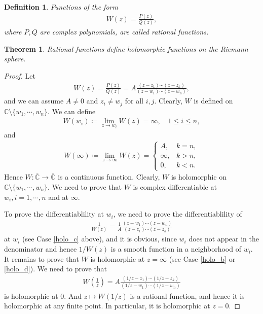 \documentclass[11pt]{book}
\newtheorem{definition}{Definition}[chapter]
\newtheorem{theorem}{Theorem}[chapter]
\theoremstyle{definition}
\numberwithin{equation}{chapter}
\begin{document}
\medskip

\begin{definition}
Functions of the form
\begin{align*}
    W(z) = \frac{P(z)}{Q(z)},
\end{align*}
where $P,Q$ are complex polynomials, are called rational functions.
\end{definition}

\medskip

\begin{theorem}
Rational functions define holomorphic functions on the Riemann sphere.
\end{theorem}
\begin{proof}
Let
\begin{align*}
    W(z) = \frac{P(z)}{Q(z)} = A \frac{(z - z_1) \cdots (z - z_k)}{(z - w_1) \cdots (z - w_n)},
\end{align*}
and we can assume $A \neq 0$ and $z_i \neq w_j$ for all $i,j$. Clearly, $W$ is defined on $\mathbb{C} \setminus \{w_1, \cdots, w_n\}$. We can define
\begin{align*}
    W(w_i) \coloneqq \lim_{z \to w_i} W(z) = \infty, \quad 1 \leq i \leq n,
\end{align*}
and 
\begin{align*}
    W(\infty) \coloneqq \lim_{z \to \infty} W(z) = \begin{cases}
        A, & k = n, \\
        \infty, & k > n, \\
        0, & k < n.
    \end{cases}
\end{align*}
Hence $W: \overline{\mathbb{C}} \to \overline{\mathbb{C}}$ is a continuous function. Clearly, $W$ is holomorphic on $\mathbb{C} \setminus \{w_1, \cdots, w_n\}$. We need to prove that $W$ is complex differentiable at $w_i, i = 1, \cdots, n$ and at $\infty$.

To prove the differentiablility at $w_i$, we need to prove the differentiablility of
\begin{align*}
    \frac{1}{W(z)} = \frac{1}{A} \frac{(z - w_1) \cdots (z - w_n)}{(z - z_1) \cdots (z - z_k)}
\end{align*}
at $w_i$ (see Case \ref{holo_c} above), and it is obvious, since $w_i$ does not appear in the denominator and hence $1/W(z)$ is a smooth function in a neighborhood of $w_i$. It remains to prove that $W$ is holomorphic at $z = \infty$ (see Case \ref{holo_b} or \ref{holo_d}). We need to prove that 
\begin{align*}
    W\left(\frac{1}{z}\right) = A \frac{(1/z - z_1) \cdots (1/z - z_k)}{(1/z - w_1) \cdots (1/z - w_n)}
\end{align*}
is holomorphic at $0$. And $z \mapsto W(1/z)$ is a rational function, and hence it is holomorphic at any finite point. In particular, it is holomorphic at $z = 0$.
\end{proof}
\end{document}
